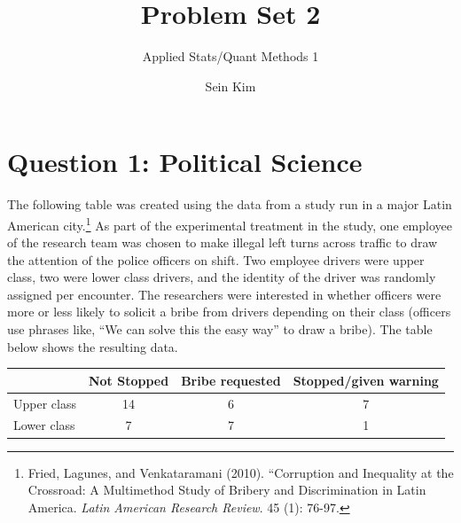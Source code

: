 \documentclass[12pt,letterpaper]{article}
\title{Problem Set 2}
\date{Sein Kim}
\author{Applied Stats/Quant Methods 1}
\begin{document}
	\maketitle
	
	\section*{Question 1: Political Science}
	
	The following table was created using the data from a study run in a major Latin American city.\footnote{Fried, Lagunes, and Venkataramani (2010). ``Corruption and Inequality at the Crossroad: A Multimethod Study of Bribery and Discrimination in Latin America. \textit{Latin American Research Review}. 45 (1): 76-97.} As part of the experimental treatment in the study, one employee of the research team was chosen to make illegal left turns across traffic to draw the attention of the police officers on shift. Two employee drivers were upper class, two were lower class drivers, and the identity of the driver was randomly assigned per encounter. The researchers were interested in whether officers were more or less likely to solicit a bribe from drivers depending on their class (officers use phrases like, ``We can solve this the easy way'' to draw a bribe). The table below shows the resulting data.
	
	\begin{table}[h!]
		\centering
		\begin{tabular}{l | c c c }
			& Not Stopped & Bribe requested & Stopped/given warning \\
			\hline
			Upper class & 14 & 6 & 7 \\
			Lower class & 7 & 7 & 1 \\
			\hline
		\end{tabular}
	\end{table}
	
\end{document}
